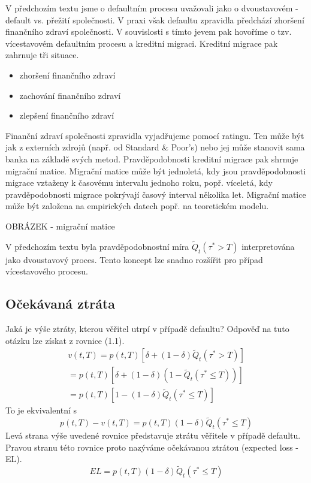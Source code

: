 V předchozím textu jsme o defaultním procesu uvažovali jako o dvoustavovém - default vs. přežití společnosti. V praxi však defaultu zpravidla předchází zhoršení finančního zdraví společnosti. V souvislosti s tímto jevem pak hovoříme o tzv. vícestavovém defaultním procesu a kreditní migraci. Kreditní migrace pak zahrnuje tři situace.
\begin{itemize}
\item zhoršení finančního zdraví
\item zachování finančního zdraví
\item zlepšení finančního zdraví
\end{itemize}
Finanční zdraví společnosti zpravidla vyjadřujeme pomocí ratingu. Ten může být jak z externích zdrojů (např. od Standard \& Poor's) nebo jej může stanovit sama banka na základě svých metod. Pravděpodobnosti kreditní migrace pak shrnuje migrační matice. Migrační matice může být jednoletá, kdy jsou pravděpodobnosti migrace vztaženy k časovému intervalu jednoho roku, popř. víceletá, kdy pravděpodobnosti migrace pokrývají časový interval několika let. Migrační matice může být založena na empirických datech popř. na teoretickém modelu.

OBRÁZEK - migrační matice

V předchozím textu byla pravděpodobnostní míra $\tilde{Q}_t(\tau^* > T)$ interpretována jako dvoustavový proces. Tento koncept lze snadno rozšířit pro případ vícestavového procesu.

\subsection{Očekávaná ztráta}

Jaká je výše ztráty, kterou věřitel utrpí v případě defaultu? Odpověď na tuto otázku lze získat z rovnice (1.1).
\begin{multline}
v(t,T) = p(t,T)[\delta + (1 - \delta)\tilde{Q}_t(\tau^* > T)]\\
= p(t,T)[\delta + (1 - \delta)(1 - \tilde{Q}_t(\tau^* \le T))]\\
= p(t,T)[1 - (1 - \delta)\tilde{Q}_t(\tau^* \le T)]
\end{multline}
To je ekvivalentní s
\begin{equation}
p(t,T) - v(t,T) = p(t,T)(1 - \delta)\tilde{Q}_t(\tau^* \le T)
\end{equation}
Levá strana výše uvedené rovnice představuje ztrátu věřitele v případě defaultu. Pravou stranu této rovnice proto nazýváme očekávanou ztrátou (expected loss - EL).
\begin{equation}
EL = p(t,T)(1 - \delta)\tilde{Q}_t(\tau^* \le T)
\end{equation}

